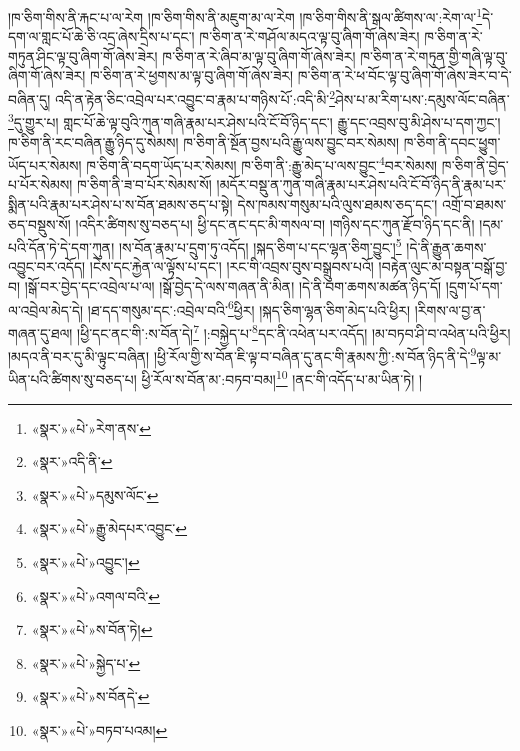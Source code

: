 །ཁ་ཅིག་གིས་ནི་རྐང་པ་ལ་རེག །ཁ་ཅིག་གིས་ནི་མཇུག་མ་ལ་རེག །ཁ་ཅིག་གིས་ནི་སྒལ་ཚིགས་ལ་:རེག་ལ་\footnote{«སྣར་»«པེ་»རེག་ནས་}དེ་དག་ལ་གླང་པོ་ཆེ་ཅི་འདྲ་ཞེས་དྲིས་པ་དང་། ཁ་ཅིག་ན་རེ་གཤོལ་མདའ་ལྟ་བུ་ཞིག་གོ་ཞེས་ཟེར། ཁ་ཅིག་ན་རེ་གཏུན་ཤིང་ལྟ་བུ་ཞིག་གོ་ཞེས་ཟེར། ཁ་ཅིག་ན་རེ་ཞིབ་མ་ལྟ་བུ་ཞིག་གོ་ཞེས་ཟེར། ཁ་ཅིག་ན་རེ་གཏུན་གྱི་གཞི་ལྟ་བུ་ཞིག་གོ་ཞེས་ཟེར། ཁ་ཅིག་ན་རེ་ཕྱགས་མ་ལྟ་བུ་ཞིག་གོ་ཞེས་ཟེར། ཁ་ཅིག་ན་རེ་ཕ་བོང་ལྟ་བུ་ཞིག་གོ་ཞེས་ཟེར་བ་དེ་བཞིན་དུ། འདི་ན་རྟེན་ཅིང་འབྲེལ་པར་འབྱུང་བ་རྣམ་པ་གཉིས་པོ་:འདི་མི་\footnote{«སྣར་»འདི་ནི་}ཤེས་པ་མ་རིག་པས་:དམུས་ལོང་བཞིན་\footnote{«སྣར་»«པེ་»དམུས་ལོང་}དུ་གྱུར་པ། གླང་པོ་ཆེ་ལྟ་བུའི་ཀུན་གཞི་རྣམ་པར་ཤེས་པའི་ངོ་བོ་ཉིད་དང་། རྒྱུ་དང་འབྲས་བུ་མི་ཤེས་པ་དག་ཀྱང་། ཁ་ཅིག་ནི་རང་བཞིན་རྒྱུ་ཉིད་དུ་སེམས། ཁ་ཅིག་ནི་སྔོན་བྱས་པའི་རྒྱུ་ལས་བྱུང་བར་སེམས། ཁ་ཅིག་ནི་དབང་ཕྱུག་ཡོད་པར་སེམས། ཁ་ཅིག་ནི་བདག་ཡོད་པར་སེམས། ཁ་ཅིག་ནི་:རྒྱུ་མེད་པ་ལས་བྱུང་\footnote{«སྣར་»«པེ་»རྒྱུ་མེདཔར་འབྱུང་}བར་སེམས། ཁ་ཅིག་ནི་བྱེད་པ་པོར་སེམས། ཁ་ཅིག་ནི་ཟ་བ་པོར་སེམས་སོ། །མདོར་བསྡུ་ན་ཀུན་གཞི་རྣམ་པར་ཤེས་པའི་ངོ་བོ་ཉིད་ནི་རྣམ་པར་སྨིན་པའི་རྣམ་པར་ཤེས་པ་ས་བོན་ཐམས་ཅད་པ་སྟེ། དེས་ཁམས་གསུམ་པའི་ལུས་ཐམས་ཅད་དང་། འགྲོ་བ་ཐམས་ཅད་བསྡུས་སོ། །འདིར་ཚིགས་སུ་བཅད་པ། ཕྱི་དང་ནང་དང་མི་གསལ་བ། །གཉིས་དང་ཀུན་རྫོབ་ཉིད་དང་ནི། །དམ་པའི་དོན་ཏེ་དེ་དག་ཀུན། །ས་བོན་རྣམ་པ་དྲུག་ཏུ་འདོད། །སྐད་ཅིག་པ་དང་ལྷན་ཅིག་བྱུང་།\footnote{«སྣར་»«པེ་»འབྱུང་།} །དེ་ནི་རྒྱུན་ཆགས་འབྱུང་བར་འདོད། །ངེས་དང་རྐྱེན་ལ་ལྟོས་པ་དང་། །རང་གི་འབྲས་བུས་བསྒྲུབས་པའོ། །བརྟེན་ལུང་མ་བསྟན་བསྒོ་བྱ་བ། །སྒོ་བར་བྱེད་དང་འབྲེལ་པ་ལ། །སྒོ་བྱེད་དེ་ལས་གཞན་ནི་མིན། །དེ་ནི་བག་ཆགས་མཚན་ཉིད་དོ། །དྲུག་པོ་དག་ལ་འབྲེལ་མེད་དེ། །ཐ་དད་གསུམ་དང་:འབྲེལ་བའི་\footnote{«སྣར་»«པེ་»འགལ་བའི་}ཕྱིར། །སྐད་ཅིག་ལྷན་ཅིག་མེད་པའི་ཕྱིར། །རིགས་ལ་བྱ་ན་གཞན་དུ་ཐལ། །ཕྱི་དང་ནང་གི་:ས་བོན་དེ།\footnote{«སྣར་»«པེ་»ས་བོན་ཏེ།} །:བསྐྱེད་པ་\footnote{«སྣར་»«པེ་»སྐྱེད་པ་}དང་ནི་འཕེན་པར་འདོད། །མ་བཏབ་ཤི་བ་འཕེན་པའི་ཕྱིར། །མདའ་ནི་བར་དུ་མི་ལྟུང་བཞིན། །ཕྱི་རོལ་གྱི་ས་བོན་ཇི་ལྟ་བ་བཞིན་དུ་ནང་གི་རྣམས་ཀྱི་:ས་བོན་ཉིད་ནི་དེ་\footnote{«སྣར་»«པེ་»ས་བོནདེ་}ལྟ་མ་ཡིན་པའི་ཚིགས་སུ་བཅད་པ། ཕྱི་རོལ་ས་བོན་མ་:བཏབ་བམ།\footnote{«སྣར་»«པེ་»བཏབ་པའམ།} །ནང་གི་འདོད་པ་མ་ཡིན་ཏེ། །

